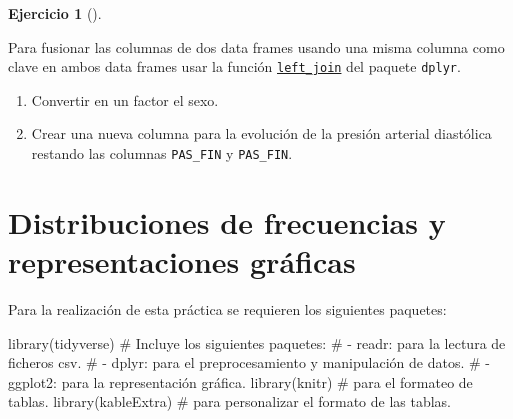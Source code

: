 \documentclass[
  a4paper,
]{scrreport}
\newenvironment{Shaded}{\begin{snugshade}}{\end{snugshade}}
\newcommand{\CommentTok}[1]{\textcolor[rgb]{0.37,0.37,0.37}{#1}}
\newcommand{\FunctionTok}[1]{\textcolor[rgb]{0.28,0.35,0.67}{#1}}
\newcommand{\NormalTok}[1]{\textcolor[rgb]{0.00,0.23,0.31}{#1}}
\theoremstyle{definition}
\newtheorem{exercise}{Ejercicio}[chapter]
\theoremstyle{remark}
\begin{document}
\begin{exercise}[]
\begin{tcolorbox}[enhanced jigsaw, rightrule=.15mm, toptitle=1mm, colbacktitle=quarto-callout-note-color!10!white, titlerule=0mm, colback=white, leftrule=.75mm, bottomtitle=1mm, colframe=quarto-callout-note-color-frame, breakable, title=\textcolor{quarto-callout-note-color}{\faInfo}\hspace{0.5em}{Ayuda}, arc=.35mm, coltitle=black, opacityback=0, bottomrule=.15mm, opacitybacktitle=0.6, left=2mm, toprule=.15mm]

Para fusionar las columnas de dos data frames usando una misma columna
como clave en ambos data frames usar la función
\href{https://dtplyr.tidyverse.org/reference/left_join.dtplyr_step.html}{\texttt{left\_join}}
del paquete \texttt{dplyr}.

\end{tcolorbox}

\begin{enumerate}
\def\labelenumi{\alph{enumi}.}
\setcounter{enumi}{5}
\item
  Convertir en un factor el sexo.
\item
  Crear una nueva columna para la evolución de la presión arterial
  diastólica restando las columnas \texttt{PAS\_FIN} y
  \texttt{PAS\_FIN}.
\end{enumerate}

\end{exercise}


\hypertarget{distribuciones-de-frecuencias-y-representaciones-gruxe1ficas}{%
\chapter{Distribuciones de frecuencias y representaciones
gráficas}\label{distribuciones-de-frecuencias-y-representaciones-gruxe1ficas}}

Para la realización de esta práctica se requieren los siguientes
paquetes:

\begin{Shaded}
\begin{Highlighting}[]
\FunctionTok{library}\NormalTok{(tidyverse) }
\CommentTok{\# Incluye los siguientes paquetes:}
\CommentTok{\# {-} readr: para la lectura de ficheros csv. }
\CommentTok{\# {-} dplyr: para el preprocesamiento y manipulación de datos.}
\CommentTok{\# {-} ggplot2: para la representación gráfica.}
\FunctionTok{library}\NormalTok{(knitr) }\CommentTok{\# para el formateo de tablas.}
\FunctionTok{library}\NormalTok{(kableExtra) }\CommentTok{\# para personalizar el formato de las tablas.}
\end{Highlighting}
\end{Shaded}
\end{document}
